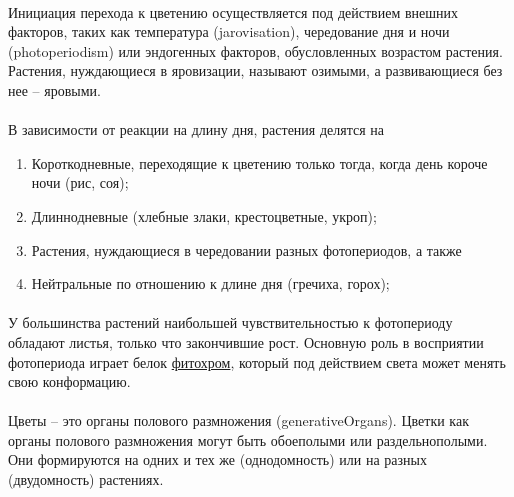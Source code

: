 \paragraph*{}Инициация перехода к цветению осуществляется под действием внешних факторов, таких как температура (\gls{jarovisation}), чередование дня и ночи (\gls{photoperiodism}) или эндогенных факторов, обусловленных возрастом растения. Растения, нуждающиеся в яровизации, называют озимыми, а развивающиеся без нее -- яровыми. 


\paragraph*{}В зависимости от реакции на длину дня, растения делятся на

\begin{enumerate}
	\item Короткодневные, переходящие к цветению только тогда, когда день короче ночи (рис, соя);
	\item Длиннодневные (хлебные злаки, крестоцветные, укроп); 
	\item Растения, нуждающиеся в чередовании разных фотопериодов, а также 
	\item Нейтральные по отношению к длине дня (гречиха, горох);
\end{enumerate}


\paragraph*{}У большинства растений наибольшей чувствительностью к фотопериоду обладают листья, только что закончившие рост. Основную роль в восприятии фотопериода играет белок \hyperlink{phitochrom}{фитохром}, который под действием света может менять свою конформацию.

\paragraph*{}Цветы -- это органы полового размножения (\gls{generativeOrgans}). Цветки как органы полового размножения могут быть обоеполыми или раздельнополыми. Они формируются на одних и тех же (однодомность) или на разных (двудомность) растениях. 

